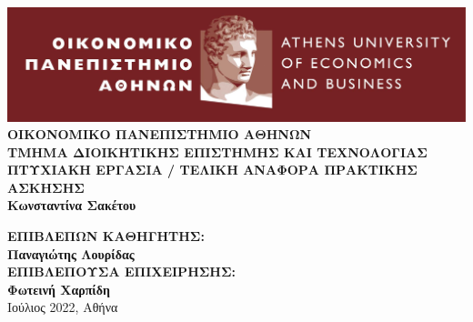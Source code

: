 \documentclass[11pt, notitlepage]{report}
\begin{document}
  \begin{titlepage}
    \centering
    \includegraphics[width=17cm]{images/aueb_logo.jpg}
    \vfill
    {\bfseries\Large
        ΟΙΚΟΝΟΜΙΚΟ ΠΑΝΕΠΙΣΤΗΜΙΟ ΑΘΗΝΩΝ\\
        \vskip0.5cm
        ΤΜΗΜΑ ΔΙΟΙΚΗΤΙΚΗΣ ΕΠΙΣΤΗΜΗΣ ΚΑΙ ΤΕΧΝΟΛΟΓΙΑΣ\\
        \vskip0.5cm
        ΠΤΥΧΙΑΚΗ ΕΡΓΑΣΙΑ / ΤΕΛΙΚΗ ΑΝΑΦΟΡΑ ΠΡΑΚΤΙΚΗΣ ΑΣΚΗΣΗΣ\\
        
    }       
    \vfill
    {\bfseries\Large        
        Κωνσταντίνα Σακέτου\\
    } 
    
    \vfill{\bfseries\Large  
      ΕΠΙΒΛΕΠΩΝ ΚΑΘΗΓΗΤΗΣ:\\
      Παναγιώτης Λουρίδας\\ 
      \vskip1cm
      ΕΠΙΒΛΕΠΟΥΣΑ ΕΠΙΧΕΙΡΗΣΗΣ:\\
      Φωτεινή Χαρπίδη\\
    } 
    \vfill{\normalsize Ιούλιος 2022, Αθήνα}
  \end{titlepage}


\nocite{*}




\end{document}
